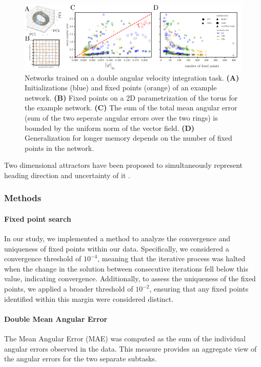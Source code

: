 \documentclass{article} %
\newcounter{ct}
\theoremstyle{definition}
\theoremstyle{remark}
\begin{document}
\begin{figure}[tbhp]
  \centering
  \includegraphics[width=\textwidth]{davit_ss}
  \caption{%
      Networks trained on a double angular velocity integration task.
    \textbf{(A)} Initializations (blue) and fixed points (orange) of an example network.
    \textbf{(B)} Fixed points on a 2D parametrization of the torus for the example network.
    \textbf{(C)} The sum of the total mean angular error (sum of the two seperate angular errors over the two rings) is bounded by the uniform norm of the vector field.
    \textbf{(D)} Generalization for longer memory depends on the number of fixed points in the network.
}\label{fig:davit}
\end{figure}

Two dimensional attractors have been proposed to simultaneously represent heading direction and uncertainty of it \citep{kutschireiter2023bayesian,sale2024bayesian}.


\subsubsection{Methods}\label{sec:supp:fastslowmethod}
\paragraph{Fixed point search}
In our study, we implemented a  method to analyze the convergence and uniqueness of fixed points within our data.
 Specifically, we considered a convergence threshold of \(10^{-4}\), meaning that the iterative process was halted when the change in the solution between consecutive iterations fell below this value, indicating convergence. Additionally, to assess the uniqueness of the fixed points, we applied a broader threshold of  \(10^{-2}\), ensuring that any fixed points identified within this margin were considered distinct.


\paragraph{Double Mean Angular Error}
The Mean Angular Error (MAE) was computed as the sum of the individual angular errors observed in the data.
 This measure provides an aggregate view of the angular errors for the two separate subtasks.
\end{document}
